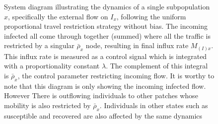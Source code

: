 \begin{figure}[ht]
    \centering
    \caption{\small System diagram illustrating the dynamics of a single subpopulation $x$, specifically the external flow on $I_x$, following the uniform proportional travel restriction strategy without bias. The incoming infected all come through together (summed) where all the traffic is restricted by a singular $\bar \rho_x$ node, resulting in final influx rate $M_{(I)x}$. This influx rate is measured as a control signal which is integrated with a proportionality constant $\lambda$. The complement of this integral is $\bar \rho_x$, the control parameter restricting incoming flow. It is worthy to note that this diagram is only showing the incoming infected flow. However There is outflowing individuals to other patches whose mobility is also restricted by $\bar \rho_x$. Individuals in other states such as susceptible and recovered are also affected by the same dynamics }
    \label{fig:Unifrom restriction diagram}
\end{figure}

